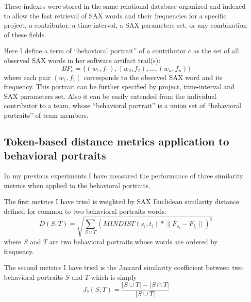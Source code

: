 \documentclass[conference]{worldcomp}
\begin{document}
These indexes were stored in the same relational database organized and indexed to allow the fast 
retrieval of SAX words and their frequencies for a specific project, 
a contributor, a time-interval, a SAX parameters set, or any combination of these fields. 

Here I define a term of ``behavioral portrait'' of a contributor $c$ as the set of all observed SAX words 
in her software artifact trail(s):
\begin{equation}
 BP_{c} = \{ (w_{1},f_{1}), (w_{2},f_{2}), ..., (w_{n},f_{n}) \}
\end{equation}
where each pair $(w_{1},f_{1})$ corresponds to the observed SAX word and its frequency. This portrait can
be further specified by project, time-interval and SAX parameters set. Also it can be easily extended 
from the individual contributor to a team, whose ``behavioral portrait'' is a union set
of ``behavioral portraits'' of team members.

\subsection{Token-based distance metrics application to behavioral portraits}
In my previous experiments I have measured the performance of three similarity metrics 
when applied to the behavioral portraits. 

The first metrics I have tried is weighted by SAX Euclidean similarity distance defined for common to two 
behavioral portraits words:
\begin{equation}
D(S,T) = \sqrt{ \sum_{S\cap T} (MINDIST(s_{i},t_{i}) * \lVert F_{s_{i}}-F_{t_{i}} \rVert )^{2}  }
\end{equation} 
where $S$ and $T$ are two behavioral portraits whose words are ordered by frequency.

The second metrics I have tried is the Jaccard similarity coefficient between two behavioral portraits
$S$ and $T$ which is simply 
\begin{equation}
J_{\delta}(S,T) = \frac{|S\cup T| - |S\cap T|}{|S\cup T|}
\end{equation} 
\end{document}
